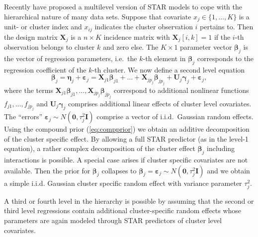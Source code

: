 \documentclass[11pt,a4paper,twoside]{bayesxarticle}
\begin{document}
Recently  have proposed  a multilevel version of STAR models to cope with the hierarchical nature of many data sets.
Suppose that covariate $x_j \in \{1,\dots,K\}$ is a unit- or cluster index   and $x_{ij}$ indicates the cluster
observation $i$ pertains to.
Then the design  matrix $\mathbf{X}_j$ is a $n \times K$ incidence matrix with $\mathbf{X}_j[i,k] = 1$ if the $i$-th observation
belongs to cluster $k$ and zero else. The $K \times 1$ parameter vector $\boldsymbol{\beta}_j$ is the vector of regression parameters,
i.e.~the $k$-th element
in $\boldsymbol{\beta}_j$ corresponds to the regression coefficient of the $k$-th cluster.
We now define a second level equation
\begin{equation}
\label{eq:compprior}
\boldsymbol{\beta}_j = \boldsymbol{\eta}_j + \boldsymbol{\varepsilon}_j =
\mathbf{X}_{j1} \boldsymbol{\beta}_{j1} + \ldots + \mathbf{X}_{jp_j} \boldsymbol{\beta}_{jp_j} +
\mathbf{U}_j \boldsymbol{\gamma}_j +  \boldsymbol{\varepsilon}_j,
\end{equation}
where the terms $\mathbf{X}_{j1} \boldsymbol{\beta}_{j1},\dots,\mathbf{X}_{jp_j} \boldsymbol{\beta}_{jp_j}$ correspond to additional nonlinear
functions $f_{j1},\dots,f_{jp_j}$ and
$\mathbf{U}_j \boldsymbol{\gamma}_j$ comprises additional linear effects of cluster level covariates.
The ``errors'' $\boldsymbol{\varepsilon}_j \sim N(\mathbf{0}, \tau^2_j \mathbf{I})$
comprise a vector of i.i.d.\ Gaussian random effects.
Using the compound prior (\ref{eq:compprior}) we obtain an additive
decomposition of the cluster specific effect. By allowing a full STAR predictor (as in the level-1 equation), a rather complex decomposition of
the cluster effect
$\boldsymbol{\beta}_j$ including interactions is possible. A special case arises if cluster specific covariates are not available. Then the
prior for $\boldsymbol{\beta}_j$ collapses to
$\boldsymbol{\beta}_j = \boldsymbol{\varepsilon}_j \sim N(\mathbf{0}, \tau^2_j \mathbf{I})$ and we obtain a simple i.i.d. Gaussian cluster
specific random effect with variance parameter $\tau^2_j$.

A third or fourth level in the hierarchy is possible by assuming that the second or third level regressions
contain additional cluster-specific random effects whose parameters are again modeled through  STAR predictors of cluster level covariates.
\end{document}
